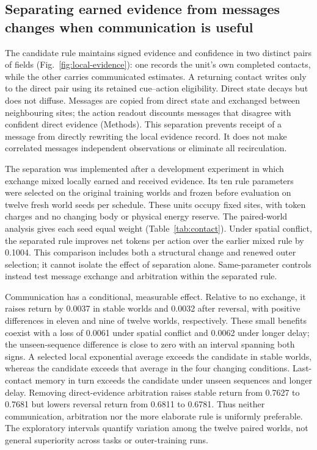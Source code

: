 \subsection*{Separating earned evidence from messages changes when communication is useful}
The candidate rule maintains signed evidence and confidence in two distinct pairs of fields (Fig.~\ref{fig:local-evidence}): one records the unit's own completed contacts, while the other carries communicated estimates. A returning contact writes only to the direct pair using its retained cue--action eligibility. Direct state decays but does not diffuse. Messages are copied from direct state and exchanged between neighbouring sites; the action readout discounts messages that disagree with confident direct evidence (Methods). This separation prevents receipt of a message from directly rewriting the local evidence record. It does not make correlated messages independent observations or eliminate all recirculation.

The separation was implemented after a development experiment in which exchange mixed locally earned and received evidence. Its ten rule parameters were selected on the original training worlds and frozen before evaluation on twelve fresh world seeds per schedule. These units occupy fixed sites, with token charges and no changing body or physical energy reserve. The paired-world analysis gives each seed equal weight (Table~\ref{tab:contact}). Under spatial conflict, the separated rule improves net tokens per action over the earlier mixed rule by 0.1004. This comparison includes both a structural change and renewed outer selection; it cannot isolate the effect of separation alone. Same-parameter controls instead test message exchange and arbitration within the separated rule.




Communication has a conditional, measurable effect. Relative to no exchange, it raises return by 0.0037 in stable worlds and 0.0032 after reversal, with positive differences in eleven and nine of twelve worlds, respectively. These small benefits coexist with a loss of 0.0061 under spatial conflict and 0.0062 under longer delay; the unseen-sequence difference is close to zero with an interval spanning both signs. A selected local exponential average exceeds the candidate in stable worlds, whereas the candidate exceeds that average in the four changing conditions. Last-contact memory in turn exceeds the candidate under unseen sequences and longer delay. Removing direct-evidence arbitration raises stable return from 0.7627 to 0.7681 but lowers reversal return from 0.6811 to 0.6781. Thus neither communication, arbitration nor the more elaborate rule is uniformly preferable. The exploratory intervals quantify variation among the twelve paired worlds, not general superiority across tasks or outer-training runs.

